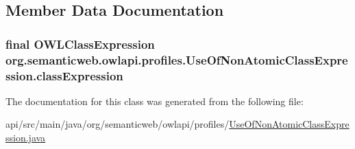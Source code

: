 \subsection{Member Data Documentation}
\hypertarget{classorg_1_1semanticweb_1_1owlapi_1_1profiles_1_1_use_of_non_atomic_class_expression_a0588c5608c078b0638dc8cb2ae4c8af8}{
\subsubsection[{class\-Expression}]{\setlength{\rightskip}{0pt plus 5cm}final {\bf O\-W\-L\-Class\-Expression} org.\-semanticweb.\-owlapi.\-profiles.\-Use\-Of\-Non\-Atomic\-Class\-Expression.\-class\-Expression\hspace{0.3cm}{\ttfamily [private]}}}\label{classorg_1_1semanticweb_1_1owlapi_1_1profiles_1_1_use_of_non_atomic_class_expression_a0588c5608c078b0638dc8cb2ae4c8af8}


The documentation for this class was generated from the following file\-:\begin{DoxyCompactItemize}
\item 
api/src/main/java/org/semanticweb/owlapi/profiles/\hyperlink{_use_of_non_atomic_class_expression_8java}{Use\-Of\-Non\-Atomic\-Class\-Expression.\-java}\end{DoxyCompactItemize}
